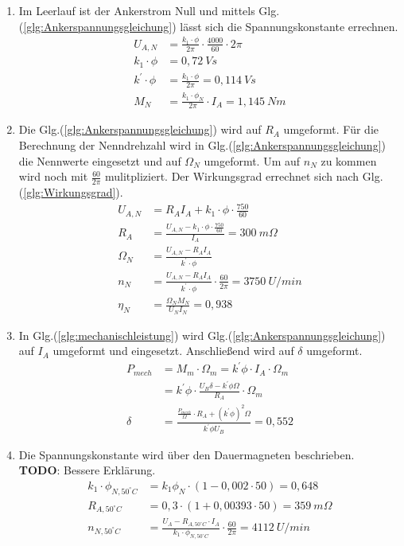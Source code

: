 \begin{solution}
\begin{enumerate}
\item Im Leerlauf ist der Ankerstrom Null und mittels Glg.(\ref{glg:Ankerspannungsgleichung}) lässt sich die Spannungskonstante errechnen.
\begin{align}
U_{A,N} &= \frac{k_1 \cdot \phi}{2 \pi} \cdot \frac{4000}{60} \cdot 2 \pi\\
k_1 \cdot \phi &= 0,72~Vs\\
k^{'} \cdot \phi &= \frac{k_1 \cdot \phi}{2 \pi} = 0,114~Vs\\
M_N &= \frac{k_1 \cdot \phi_N}{2 \pi} \cdot I_A = 1,145~Nm
\end{align}
\item Die Glg.(\ref{glg:Ankerspannungsgleichung}) wird auf $R_A$ umgeformt. Für die Berechnung der Nenndrehzahl wird in Glg.(\ref{glg:Ankerspannungsgleichung}) die Nennwerte eingesetzt und auf $\Omega_N$ umgeformt. Um auf $n_N$ zu kommen wird noch mit $\frac{60}{2 \pi}$ mulitpliziert. Der Wirkungsgrad errechnet sich nach Glg.(\ref{glg:Wirkungsgrad}).
\begin{align}
U_{A,N} &= R_A I_A + k_1\cdot \phi \cdot \frac{750}{60}\\
R_A &= \frac{U_{A,N} -k_1\cdot \phi \cdot \frac{750}{60}}{I_A} = 300~m\Omega\\
\Omega_N &= \frac{U_{A,N} - R_A I_A}{k^{'}\cdot \phi}\\
n_N &= \frac{U_{A,N} - R_A I_A}{k^{'}\cdot \phi} \cdot \frac{60}{2 \pi} = 3750 ~U /min\\
\eta_N &= \frac{\Omega_N M_N}{U_N I_N} = 0,938
\end{align}
\item In Glg.(\ref{glg:mechanischleistung}) wird Glg.(\ref{glg:Ankerspannungsgleichung}) auf $I_A$ umgeformt und eingesetzt. Anschließend wird auf $\delta$ umgeformt.
\begin{align}
P_{mech} &=M_m \cdot \Omega_m = k^{'} \phi \cdot I_A \cdot \Omega_m\\
&= k^{'} \phi \cdot \frac{U_B \delta - k^{'} \phi \Omega}{R_A} \cdot \Omega_m\\
\delta &= \frac{\frac{P_{mech}}{\Omega} \cdot R_A + (k^{'} \phi)^2 \Omega}{k^{'} \phi U_B}=0,552
\end{align}
\item Die Spannungskonstante wird über den Dauermagneten beschrieben.\\
\textbf{TODO}: Bessere Erklärung.
\begin{align}
k_1 \cdot \phi_{N,50^\circ C}&= k_1 \phi_N \cdot (1 - 0,002 \cdot 50)= 0,648\\
R_{A,50^\circ C} &= 0,3 \cdot (1+ 0,00393 \cdot 50) = 359~m\Omega\\
n_{N,50^\circ C} &= \frac{U_A -R_{A,50^\circ C} \cdot I_A}{k_1 \cdot \phi_{N,50^\circ C}}\cdot \frac{60}{2 \pi} = 4112 ~U/min
\end{align}
\end{enumerate}
\end{solution}